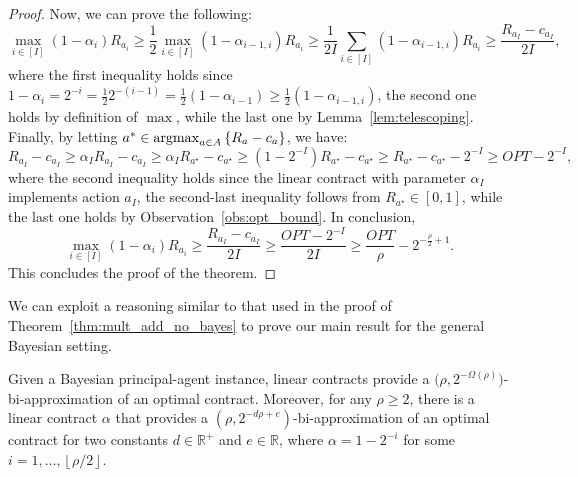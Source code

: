 \begin{proof}
	Now, we can prove the following:
	\[
		\max_{i \in [I]} \left(  1  - \alpha_{i}  \right) R_{a_i} \geq \frac{1}{2} \max_{i \in [I]} \left(  1  - \alpha_{i-1, i}  \right) R_{a_i} \geq \frac{1}{2 I} \sum_{i \in [I]} \left( 1 - \alpha_{i-1, i}  \right) R_{a_i} \geq \frac{R_{a_I} - c_{a_I}}{2 I},
	\]
	where the first inequality holds since $1 - \alpha_{i} = 2^{-i} = \frac{1}{2} 2^{- \left(  i -1 \right)} = \frac{1}{2} \left( 1 - \alpha_{i - 1} \right) \geq \frac{1}{2} \left( 1 - \alpha_{i - 1, i} \right) $, the second one holds by definition of $\max$, while the last one by Lemma~\ref{lem:telescoping}.
	Finally, by letting $a^\ast \in \operatorname*{argmax}_{a \in A} \left\{  R_a - c_a \right\}$, we have:
	\[
		R_{a_I} - c_{a_I} \geq \alpha_{I}  R_{a_I} - c_{a_I} \geq \alpha_{I}  R_{a^\star} - c_{a^\star} \geq \left( 1 - 2^{-I} \right) R_{a^\star} - c_{a^\star} \geq R_{a^\star} - c_{a^\star} - 2^{-I} \geq OPT - 2^{-I},
	\]
	where the second inequality holds since the linear contract with parameter $\alpha_{I}$ implements action $a_I$, the second-last inequality follows from $R_{a^\star} \in [0,1]$, while the last one holds by Observation~\ref{obs:opt_bound}. 
	In conclusion,
	\[
		\max_{i \in [I]} \left(  1  - \alpha_{i} \right) R_{a_i} \geq \frac{R_{a_I} - c_{a_I}}{2 I} \geq \frac{OPT - 2^{-I}}{2 I} \geq   \frac{OPT}{\rho} - 2^{-\frac{\rho}{2} +1 }.
	\]
	This concludes the proof of the theorem. 
\end{proof}


We can exploit a reasoning similar to that used in the proof of Theorem~\ref{thm:mult_add_no_bayes} to prove our main result for the general Bayesian setting.

\begin{theorem}\label{thm:mult_add_bayes}
	Given a Bayesian principal-agent instance, linear contracts provide a $\big( \rho, 2^{-\Omega \left( \rho \right)} \big)$-bi-approximation of an optimal contract.
	Moreover, for any $\rho \geq 2$, there is a linear contract $\alpha$ that provides a $\left( \rho, 2^{- d \rho + e } \right)$-bi-approximation of an optimal contract for two constants $d \in \mathbb{R}^+$ and $e \in \mathbb{R}$, where $\alpha = 1 - 2^{-i}$ for some $i = 1, \ldots, \left\lfloor \rho /2 \right\rfloor$.
\end{theorem}


